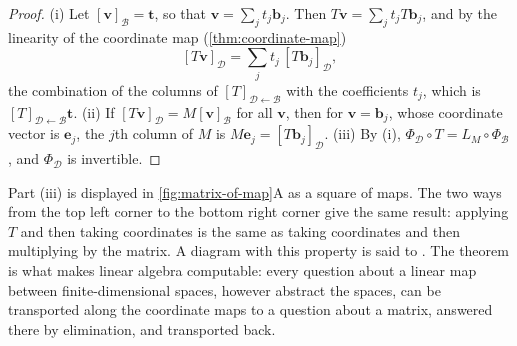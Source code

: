 \begin{proof}
(i) Let $[\mathbf v]_{\mathcal B}=\mathbf t$, so that $\mathbf v=\sum_jt_j\mathbf b_j$. Then $T\mathbf v=\sum_jt_jT\mathbf b_j$, and by the linearity of the coordinate map (\cref{thm:coordinate-map})
\[
[T\mathbf v]_{\mathcal D}=\sum_jt_j\,[T\mathbf b_j]_{\mathcal D},
\]
the combination of the columns of $[T]_{\mathcal D\leftarrow\mathcal B}$ with the coefficients $t_j$, which is $[T]_{\mathcal D\leftarrow\mathcal B}\mathbf t$. (ii) If $[T\mathbf v]_{\mathcal D}=M[\mathbf v]_{\mathcal B}$ for all $\mathbf v$, then for $\mathbf v=\mathbf b_j$, whose coordinate vector is $\mathbf e_j$, the $j$th column of $M$ is $M\mathbf e_j=[T\mathbf b_j]_{\mathcal D}$. (iii) By (i), $\Phi_{\mathcal D}\circ T=L_M\circ\Phi_{\mathcal B}$, and $\Phi_{\mathcal D}$ is invertible.
\end{proof}

Part (iii) is displayed in \cref{fig:matrix-of-map}A as a square of maps. The two ways from the top left corner to the bottom right corner give the same result: applying $T$ and then taking coordinates is the same as taking coordinates and then multiplying by the matrix. A diagram with this property is said to . The theorem is what makes linear algebra computable: every question about a linear map between finite-dimensional spaces, however abstract the spaces, can be transported along the coordinate maps to a question about a matrix, answered there by elimination, and transported back.

